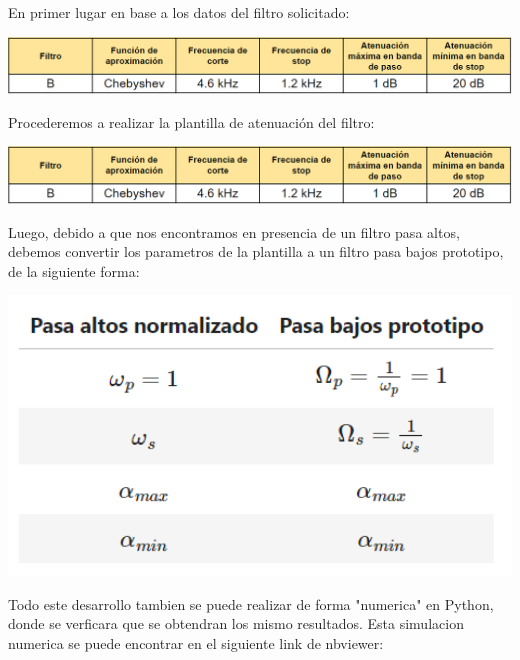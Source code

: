 \documentclass[main.tex]{subfiles}
\begin{document}
	En primer lugar en base a los datos del filtro solicitado:
	
	\bigskip	
	\centering
	\includegraphics[width=15cm]{./../Imagenes/PlantillaConsigna.png}
	\raggedright	
	\bigskip
	
	Procederemos a realizar la plantilla de atenuación del filtro:
	
	\bigskip	
	\centering
	\includegraphics[width=15cm]{./../Imagenes/PlantillaConsigna.png}
	\raggedright	
	\bigskip
	
	Luego, debido a que nos encontramos en presencia de un filtro pasa altos, debemos convertir los parametros de la plantilla a un filtro pasa bajos prototipo, de la siguiente forma:
	
	\bigskip	
	\centering
	\includegraphics[width=15cm]{./../Imagenes/ConversionHPLP.png}
	\raggedright	
	\bigskip
	
	Todo este desarrollo tambien se puede realizar de forma "numerica" en Python, donde se verficara que se obtendran los mismo resultados. Esta simulacion numerica se puede encontrar en el siguiente link de nbviewer: 
	
\end{document}

